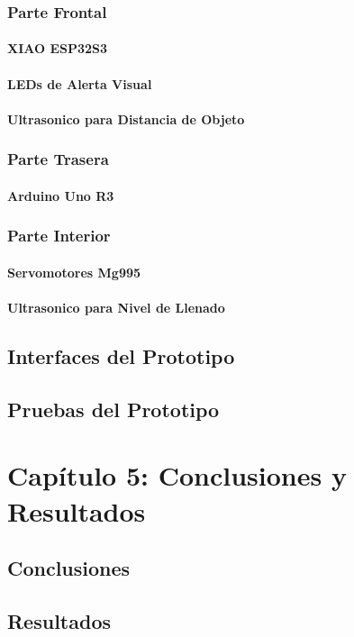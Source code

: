 \documentclass{extbook}
\begin{document}
\subsection{Parte Frontal}
\subsubsection{XIAO ESP32S3}

\subsubsection{LEDs de Alerta Visual}

\subsubsection{Ultrasonico para Distancia de Objeto}

\subsection{Parte Trasera}
\subsubsection{Arduino Uno R3}

\subsection{Parte Interior}
\subsubsection{Servomotores Mg995}

\subsubsection{Ultrasonico para Nivel de Llenado}

\section{Interfaces del Prototipo}

\section{Pruebas del Prototipo}


\chapter{Capítulo 5: Conclusiones y Resultados}
\section{Conclusiones}

\section{Resultados}



\end{document}
